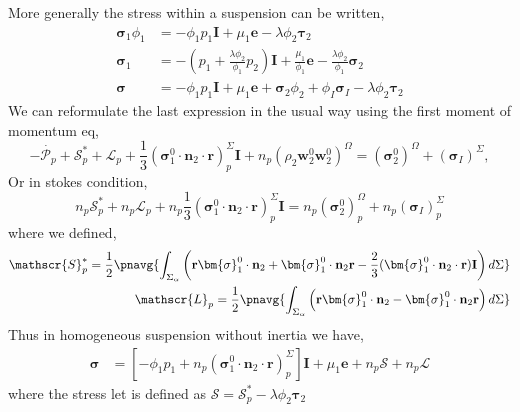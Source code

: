 More generally the stress within a suspension can be written,
\begin{align*}
    \bm{\sigma}_1 \phi_1
    &=- \phi_1 p_1 \textbf{I}
    + \mu_1 \textbf{e}
    - \lambda \phi_2 \bm{\tau}_2\\
    \bm{\sigma}_1 
    &= - \left(p_1 + \frac{\lambda \phi_2}{\phi_1} p_2\right) \textbf{I}
    + \frac{\mu_1}{\phi_1} \textbf{e}
    - \frac{\lambda \phi_2}{\phi_1} \bm{\sigma}_2\\
    \bm{\sigma}
    &= - \phi_1 p_1  \textbf{I}
    + \mu_1 \textbf{e}
    + \bm{\sigma}_2 \phi_2 
    +\phi_I \bm{\sigma}_I 
    - \lambda \phi_2 \bm{\tau}_2
\end{align*}
We can reformulate the last expression in the usual way using the first moment of momentum eq, 
\begin{equation}
    -  \dot{\mathcal{P}_p}
    +  \mathscr{S}_p^*
    +  \mathscr{L}_p
    + \frac{1}{3}(\bm{\sigma}_1^0 \cdot \textbf{n}_2 \cdot \textbf{r})_p^\Sigma \textbf{I}
    + n_p (\rho_2 \textbf{w}_2^0  \textbf{w}_2^0 )^\Omega
    =   (\bm{\sigma}_2^0)^\Omega
    + (\bm{\sigma}_I)^\Sigma,
\end{equation}
Or in stokes condition, 
\begin{equation}
    n_p \mathscr{S}_p^*
+ n_p \mathscr{L}_p
+ n_p\frac{1}{3}(\bm{\sigma}_1^0 \cdot \textbf{n}_2 \cdot \textbf{r})_p^\Sigma \textbf{I}
    = n_p \left(
        \bm{\sigma}_2^0
    \right)_p^\Omega
    +n_p (\bm{\sigma}_I)^\Sigma_p
\end{equation}
where we defined, 
\begin{align*}
    \mathscr{S}_p^* =\frac{1}{2} \pnavg{\int_{\Sigma_\alpha} \left(
        \textbf{r} \bm{\sigma}_1^0 \cdot \textbf{n}_2
        +  \bm{\sigma}_1^0 \cdot \textbf{n}_2\textbf{r}
        -
          \frac{2}{3}(\bm{\sigma}_1^0 \cdot \textbf{n}_2 \cdot \textbf{r})\textbf{I}
        \right)  d\Sigma}\\
    \mathscr{L}_p =\frac{1}{2} \pnavg{\int_{\Sigma_\alpha} \left(
        \textbf{r} \bm{\sigma}_1^0 \cdot \textbf{n}_2
        - \bm{\sigma}_1^0 \cdot \textbf{n}_2\textbf{r}
        \right) d\Sigma}
\end{align*}
Thus in homogeneous suspension without inertia we have, 
\begin{align*}
    \bm{\sigma}
    &= [- \phi_1 p_1 
    + n_p (\bm{\sigma}_1^0 \cdot \textbf{n}_2 \cdot \textbf{r})^\Sigma_p] \textbf{I}
    + \mu_1 \textbf{e}
    + n_p \mathscr{S}
    + n_p \mathscr{L}
\end{align*}
where the stress let is defined as $\mathscr{S} = \mathscr{S}_p^* - \lambda \phi_2 \bm{\tau}_2$

